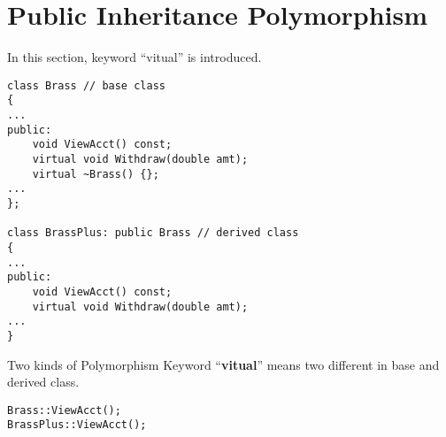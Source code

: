 \documentclass[10pt,a4paper,oneside]{article}
\begin{document}
\section{Public Inheritance Polymorphism}
In this section, keyword ``vitual'' is introduced. 
\begin{lstlisting}
class Brass // base class
{
...
public:
    void ViewAcct() const;
    virtual void Withdraw(double amt);
    virtual ~Brass() {};
...
};

class BrassPlus: public Brass // derived class
{
...
public:
	void ViewAcct() const;
    virtual void Withdraw(double amt);
...
}
\end{lstlisting}
Two kinds of Polymorphism
Keyword ``{\bfseries vitual}'' means two different in base and derived class.
\begin{lstlisting}
Brass::ViewAcct();
BrassPlus::ViewAcct();
\end{lstlisting}
\end{document}
